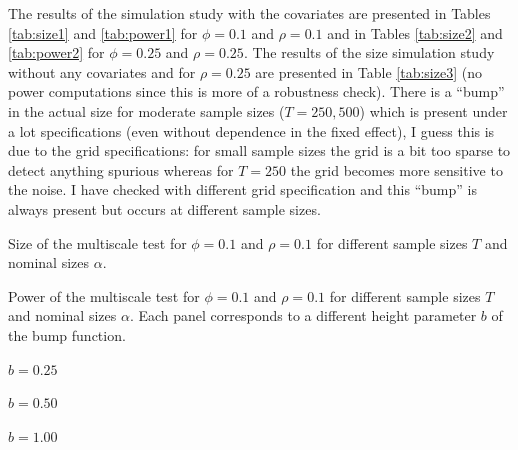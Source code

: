 \documentclass[a4paper,12pt]{article}
\begin{document}
\begin{enumerate}[label=\arabic*.,leftmargin=0.6cm]
{\begin{itemize}[topsep=0pt]
{\color{red} The results of the simulation study with the covariates are presented in Tables \ref{tab:size1} and \ref{tab:power1} for $\phi = 0.1$ and $\rho = 0.1$ and in Tables \ref{tab:size2} and \ref{tab:power2} for $\phi = 0.25$ and $\rho = 0.25$. The results of the size simulation study without any covariates and for $\rho = 0.25$ are presented in Table \ref{tab:size3} (no power computations since this is more of a robustness check). There is a ``bump'' in the actual size for moderate sample sizes ($T = 250, 500$) which is present under a lot specifications (even without dependence in the fixed effect), I guess this is due to the grid specifications: for small sample sizes the grid is a bit too sparse to detect anything spurious whereas for $T=250$ the grid becomes more sensitive to the noise. I have checked with different grid specification and this ``bump'' is always present but occurs at different sample sizes.}

\begin{table}[t]
\footnotesize{
\begin{center}
\caption{Size of the multiscale test for $\phi = 0.1$ and $\rho = 0.1$ for different sample sizes $T$ and nominal sizes $\alpha$.}
\label{tab:size1}
\renewcommand{\arraystretch}{1.2}

\end{center}}
\footnotesize{
\begin{center}
\caption{Power of the multiscale test for $\phi = 0.1$ and $\rho = 0.1$ for different sample sizes $T$ and nominal sizes $\alpha$. Each panel corresponds to a different height parameter $b$ of the bump function.}\label{tab:power1}
\begin{subtable}[b]{0.32\textwidth}
\centering
\caption{$b = 0.25$}\label{tab:power1_025}
\renewcommand{\arraystretch}{1.2}

\end{subtable}
\begin{subtable}[b]{0.32\textwidth}
\centering
\caption{$b = 0.50$}\label{tab:power1_050}
\renewcommand{\arraystretch}{1.2}

\end{subtable}
\begin{subtable}[b]{0.32\textwidth}
\centering
\caption{$b = 1.00$}\label{tab:power1_100}
\renewcommand{\arraystretch}{1.2}

\end{subtable}
\end{center}}
\vspace{-0.4cm}
\end{table}


\end{itemize}}
\end{enumerate}
\end{document}
